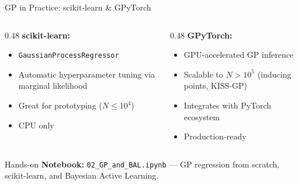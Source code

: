 \documentclass[aspectratio=169,11pt]{beamer}
\begin{document}
\begin{frame}{GP in Practice: scikit-learn \& GPyTorch}
\begin{columns}[T]
\begin{column}{0.48\textwidth}
\textbf{scikit-learn:}
\begin{itemize}
  \item \texttt{GaussianProcessRegressor}
  \item Automatic hyperparameter tuning via marginal likelihood
  \item Great for prototyping ($N \leq 10^4$)
  \item CPU only
\end{itemize}
\end{column}
\begin{column}{0.48\textwidth}
\textbf{GPyTorch:}
\begin{itemize}
  \item GPU-accelerated GP inference
  \item Scalable to $N > 10^5$ (inducing points, KISS-GP)
  \item Integrates with PyTorch ecosystem
  \item Production-ready
\end{itemize}
\end{column}
\end{columns}

\vspace{0.5cm}
\begin{block}{Hands-on}
\textbf{Notebook:} \texttt{02\_GP\_and\_BAL.ipynb} --- GP regression from scratch, scikit-learn, and Bayesian Active Learning.
\end{block}
\end{frame}
\end{document}
